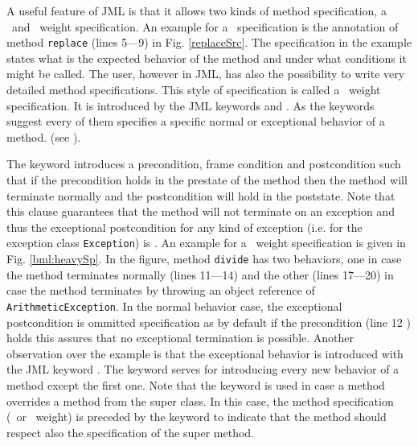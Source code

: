 \documentclass[a4paper]{llncs}
\begin{document}
A useful feature of JML is that it allows two kinds of method specification, a \light  \ and \heavy \ weight specification. 
An example for a \light \  specification is the annotation of method \texttt{replace} (lines 5---9) in Fig. \ref{replaceSrc}. The specification in 
the example states what is the expected behavior of the method and under what conditions it might be called.
The user, however in JML, has also the possibility
to write very detailed method specifications. This style of specification is called a \heavy  \ weight specification.
 It is introduced by the JML keywords  and . As the keywords
suggest every of them specifies a specific normal or exceptional behavior of a method.  (see \cite{PD06LBR}). 

The keyword   introduces a precondition, frame condition and postcondition 
such that if the precondition holds in the prestate of the
 method then the method will terminate normally and the postcondition will hold in the poststate.
 Note that this clause guarantees that the method will not terminate on an exception and thus the exceptional postcondition 
for any kind of exception (i.e. for the exception class  \texttt{Exception}) is  .
An example for a \heavy \ weight specification is given in Fig. \ref{bml:heavySp}. In the figure, method \texttt{divide} has 
two behaviors, one in case the method terminates normally (lines 11---14) and the other (lines 17---20) in case the method
 terminates by throwing an object reference of \texttt{ArithmeticException}.
 In the normal behavior case, the exceptional postcondition is ommitted  specification as by default if the precondition (line 12 )
 holds this assures that no exceptional
 termination is possible. Another observation over the example is that the exceptional behavior is introduced with the JML keyword . 
 The keyword   serves for introducing every new behavior of a method except the first one. Note that the keyword  
 is used in case a  method overrides a method from the super class. In this case, the method specification (\heavy \ or \light \ weight) is preceded by the keyword  
 to indicate that the method should respect also the specification of the super method.
\end{document}

